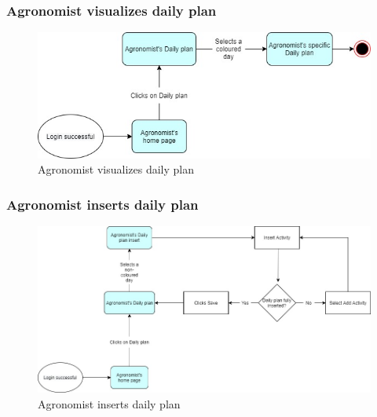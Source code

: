 \documentclass{article}
\begin{document}
        
        
        \subsubsection{Agronomist visualizes daily plan}
            \begin{figure} [h]
                \centering
                \includegraphics[width=1\textwidth]{images/UserInterfaces/MapsFunctionalities/15. AgronomistVisualizesDailyPlan.jpg}
                \caption{\label{fig:AgronomistVisualizeDailyPlan}Agronomist visualizes daily plan}
            \end{figure}
    
        \newpage
        
        \subsubsection{Agronomist inserts daily plan}
            \begin{figure} [h]
                \centering
                \includegraphics[width=1\textwidth]{images/UserInterfaces/MapsFunctionalities/17. AgronomistInsertsDailyPlan.jpg}
                \caption{\label{fig:AgronomistInsertDailyPlan}Agronomist inserts daily plan}
            \end{figure}
        
    
        
\end{document}
